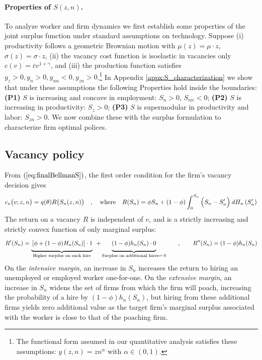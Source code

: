 \paragraph{Properties of $S(z,n)$.}
To analyze worker and firm dynamics we first establish some properties of the joint surplus function under standard assumptions on technology.
Suppose
(i) productivity follows a geometric Brownian motion with $\mu(z) = \mu\cdot z$, $\sigma(z) =\sigma \cdot z$,
(ii) the vacancy cost function is isoelastic in vacancies only $c(v) = \bar{c} v^{1+\gamma}$, and
(iii) the production function satisfies $y_z > 0, y_n >0, y_{nn} < 0, y_{zn} > 0$.\footnote{
    The functional form assumed in our quantitative analysis satisfies these assumptions: $y(z,n) = zn^\alpha$ with $\alpha \in(0,1)$.}
In Appendix \ref{appx:S_characterization} we show that under these assumptions the following Properties hold inside the boundaries:
\textbf{(P1)} $S$ is increasing and concave in employment: $S_n > 0$, $S_{nn} < 0$;
\textbf{(P2)} $S$ is increasing in productivity: $S_z > 0$;
\textbf{(P3)} $S$ is supermodular in productivity and labor: $S_{zn}> 0$.
We now combine these with the surplus formulation to characterize firm optimal polices.

\subsection{Vacancy policy}
From $(\ref{eq:finalBellmanS})$, the first order condition for the firm's vacancy decision gives
\vspace*{-.3cm}\begin{equation}\label{eq:voptimality}
c_v\big(v;z,n\big) = q(\theta)R\big(S_n(z,n)\big)
\quad,\quad\text{where}\quad R(S_n) = \phi
S_n+\left(1-\phi\right)\int_{0}^{S_n} \Big( S_n-S_n^{\prime} \Big) \:dH_n\left(S_n^{\prime}%
\right)
\vspace*{-.3cm}\end{equation}
The return on a vacancy $R$ is independent of $v$, and is a strictly increasing and strictly convex function of only marginal surplus:
\vspace*{-.3cm}\begin{equation}\label{eq:Rprime}
R^\prime(S_n) = \underbrace{\Big.\left[\phi + (1-\phi)H_n(S_n)\right]\cdot 1\Big.}_{\text{Higher surplus on each hire}} \:\:+ \underbrace{\Big.(1-\phi)h_n(S_n)\cdot 0\Big.}_{\text{Surplus on additional hires}=\:0}
\quad\quad,\quad\quad
R^{\prime\prime}(S_n) = (1-\phi)h_n(S_n) \notag
\vspace*{-.3cm}\end{equation}
On the \emph{intensive margin}, an increase in $S_n$ increases the return to hiring an unemployed or employed worker one-for-one.
On the \emph{extensive margin}, an increase in $S_n$ widens the set of firms from which the firm will poach, increasing the probability of a hire by $(1-\phi)h_n(S_n)$, but hiring from these additional firms yields zero additional value as the target firm's marginal surplus associated with the worker is close to that of the poaching firm.

